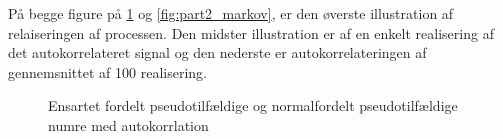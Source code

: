 På begge figure på \ref{fig:part2_ran} og \ref{fig:part2_markov}, er den øverste illustration af relaiseringen af processen. Den midster illustration er af en enkelt realisering af det autokorrelateret signal og den nederste er autokorrelateringen  af gennemsnittet af 100 realisering.  
 \begin{figure}[!h]
	\centering
	\caption{ Ensartet fordelt pseudotilfældige og normalfordelt pseudotilfældige numre med autokorrlation }
	\label{fig:part2_ran}
\end{figure}

